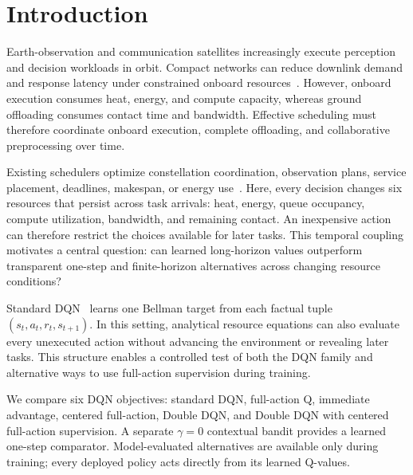 \documentclass[11pt]{article}
\begin{document}
\section{Introduction}

\color{red}%
Earth-observation and communication satellites increasingly execute perception and decision workloads in orbit. Compact networks can reduce downlink demand and response latency under constrained onboard resources~\cite{9925218,10107454,10378728,10440355,10423050}. However, onboard execution consumes heat, energy, and compute capacity, whereas ground offloading consumes contact time and bandwidth. Effective scheduling must therefore coordinate onboard execution, complete offloading, and collaborative preprocessing over time.
\color{black}%

\color{red}%
Existing schedulers optimize constellation coordination, observation plans, service placement, deadlines, makespan, or energy use~\cite{RN8,RN10,RN20,RN22,RN23,RN27,RN28}. Here, every decision changes six resources that persist across task arrivals: heat, energy, queue occupancy, compute utilization, bandwidth, and remaining contact. An inexpensive action can therefore restrict the choices available for later tasks. This temporal coupling motivates a central question: can learned long-horizon values outperform transparent one-step and finite-horizon alternatives across changing resource conditions?
\color{black}%

\color{red}%
Standard DQN~\cite{mnih2015human,watkins1992q} learns one Bellman target from each factual tuple $(s_t,a_t,r_t,s_{t+1})$. In this setting, analytical resource equations can also evaluate every unexecuted action without advancing the environment or revealing later tasks. This structure enables a controlled test of both the DQN family and alternative ways to use full-action supervision during training.
\color{black}%

\color{red}%
We compare six DQN objectives: standard DQN, full-action Q, immediate advantage, centered full-action, Double DQN, and Double DQN with centered full-action supervision. A separate $\gamma=0$ contextual bandit provides a learned one-step comparator. Model-evaluated alternatives are available only during training; every deployed policy acts directly from its learned Q-values.
\color{black}%
\end{document}
